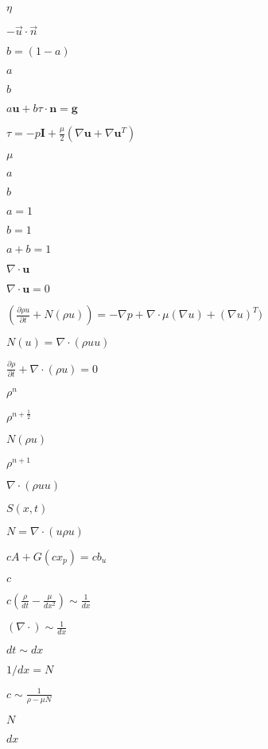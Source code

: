 \documentclass{article}
\begin{document}
$ \eta $
\pagebreak

$ -\vec{u} \cdot \vec{n}$
\pagebreak

$ b = (1-a) $
\pagebreak

$a$
\pagebreak

$b$
\pagebreak

$ a\mathbf{u} + b\tau\cdot\mathbf{n} = \mathbf{g}$
\pagebreak

$\tau = -p\mathbf{I} + \frac{\mu}{2}\left(\nabla\mathbf{u} + \nabla\mathbf{u}^T\right)$
\pagebreak

$\mu$
\pagebreak

$ a$
\pagebreak

$ b $
\pagebreak

$ a = 1 $
\pagebreak

$b = 1$
\pagebreak

$a + b = 1$
\pagebreak

$ \nabla \cdot \mathbf{u} $
\pagebreak

$ \nabla \cdot \mathbf{u} = 0 $
\pagebreak

$(\frac{\partial \rho u}{\partial t} + N(\rho u)) = -\nabla p + \nabla \cdot \mu (\nabla u) + (\nabla u)^T )$
\pagebreak

$ N(u) = \nabla \cdot (\rho u u) $
\pagebreak

$ \frac{\partial \rho}{\partial t} + \nabla \cdot (\rho u) = 0 $
\pagebreak

$\rho^n$
\pagebreak

$\rho^{n+\frac{1}{2}}$
\pagebreak

$N(\rho u)$
\pagebreak

$\rho^{n+1}$
\pagebreak

$ \nabla \cdot (\rho u u)$
\pagebreak

$ S(x,t) $
\pagebreak

$N = \nabla \cdot (u \rho u)$
\pagebreak

$ c A + G(c x_p) = c b_u$
\pagebreak

$ c $
\pagebreak

$ c(\frac{\rho}{dt} - \frac{\mu}{dx^2}) \sim \frac{1}{dx} $
\pagebreak

$ (\nabla \cdot) \sim \frac{1}{dx} $
\pagebreak

$ dt \sim dx $
\pagebreak

$ 1/dx = N $
\pagebreak

$ c \sim \frac{1}{\rho - \mu N} $
\pagebreak

$ N $
\pagebreak

$ dx $
\pagebreak
\end{document}
